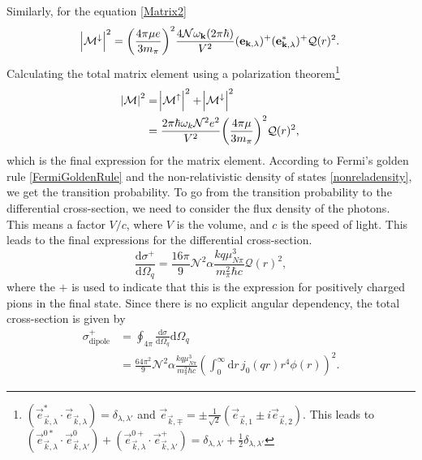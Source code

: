 Similarly, for the equation \eqref{Matrix2}
\begin{equation}
	\abs{\mathcal{M}^\downarrow}^2 = \bigg( \frac{4\pi \mu e}{3 m_\pi}\bigg)^2 \frac{4\mathcal{N}\omega_{\bm{\mathrm{k}}}(2\pi\hbar)}{V^2}(\bm{\mathrm{e}}_{\bm{\mathrm{k}},\lambda})^+(\bm{\mathrm{e}}_{\bm{\mathrm{k}},\lambda}^*)^+ \mathcal{Q}(r)^2.
\end{equation}
Calculating the total matrix element using a polarization theorem\footnote{$(\vec{e}_{\vec{k},\lambda}^*\cdot \vec{e}_{\vec{k},\lambda})=\delta_{\lambda,\lambda'}$ and $\vec{e}_{\vec{k},\mp}=\pm\frac{1}{\sqrt{2}}(\vec{e}_{\vec{k},1}\pm i\vec{e}_{\vec{k},2})$. This leads to $(\vec{e}^{0*}_{\vec{k},\lambda}\cdot\vec{e}^{0}_{\vec{k},\lambda'})+(\vec{e}^{0+}_{\vec{k},\lambda}\cdot\vec{e}^{+}_{\vec{k},\lambda'})=\delta_{\lambda,\lambda'}+\frac{1}{2}\delta_{\lambda,\lambda'}$}
\begin{align}
	\abs{\mathcal{M}}^2 &= \abs{\mathcal{M}^\uparrow}^2 + \abs{\mathcal{M}^\downarrow}^2 \\
	&= \frac{2\pi \hbar \omega_k \mathcal{N}^2 e^2}{V^2} \bigg( \frac{4\pi\mu}{3m_\pi}\bigg)^2 \mathcal{Q}(r)^2,
\end{align}
which is the final expression for the matrix element. According to Fermi's golden rule \eqref{FermiGoldenRule} and the non-relativistic density of states \eqref{nonreladensity}, we get the transition probability.
To go from the transition probability to the differential cross-section, we need to consider the flux density of the photons. This means a factor $V/c$, where $V$ is the volume, and $c$ is the speed of light. This leads to the final expressions for the differential cross-section.
\begin{equation}\label{diffcrosssection}
	\frac{\text{d}\sigma^+}{\text{d}\Omega_q}=\frac{16 \pi}{9} \mathcal{N}^2 \alpha\frac{kq\mu^3_{N\pi}}{m_\pi^2 \hbar c}\mathcal{Q}(r)^2,
\end{equation}
where the $+$ is used to indicate that this is the expression for positively charged pions in the final state. Since there is no explicit angular dependency, the total cross-section is given by
\begin{align} 
	\sigma_\text{dipole}^+ & = \oint_{4\pi} \frac{\text{d}\sigma}{\text{d}\Omega_q} \text{d}\Omega_q \\
	&= \frac{64\pi^2}{9}\mathcal{N}^2 \alpha \frac{kq\mu^3_{N\pi}}{m_\pi^2 \hbar c} \left( \int_0^\infty \text{d}r \, j_0(qr)r^4 \phi(r)\right)^2 \label{dipoletotalcross}.
\end{align}
